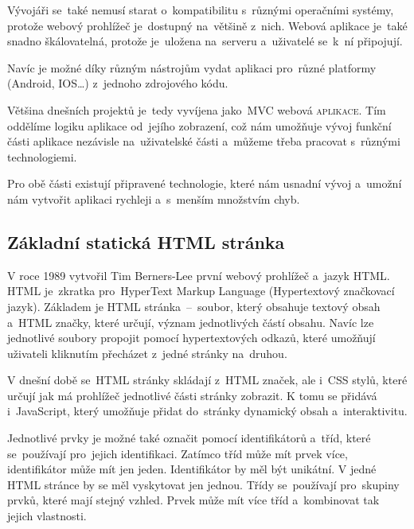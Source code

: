 \documentclass[14pt,a4paper]{article}
\begin{document}
    Vývojáři se~také nemusí starat o~kompatibilitu s~různými operačními systémy, protože webový prohlížeč
    je~dostupný na~většině z~nich. Webová aplikace je~také snadno škálovatelná, protože je~uložena na~serveru a~uživatelé se~k~ní připojují.
    
    Navíc je možné díky různým nástrojům vydat aplikaci pro~různé platformy (Android, IOS\dots) z~jednoho zdrojového kódu.\parencite{adobe:webapp}

    Většina dnešních projektů je~tedy vyvíjena jako~MVC webová \textsc{aplikace}. Tím oddělíme logiku aplikace od~jejího zobrazení, což nám umožňuje vývoj funkční části aplikace nezávisle na~uživatelské části a~můžeme třeba pracovat s~různými technologiemi.
    
    Pro obě části existují připravené technologie, které nám usnadní vývoj a~umožní nám vytvořit aplikaci rychleji a~s~menším množstvím chyb.

    \parencite{itnetworkBestPractices}

        \subsection{Základní statická HTML stránka}
        V roce 1989 vytvořil Tim Berners-Lee první webový prohlížeč a~jazyk HTML. HTML je~zkratka pro~HyperText Markup Language (Hypertextový značkovací jazyk).
        Základem je HTML stránka~--~soubor, který obsahuje textový obsah a~HTML značky, které určují, význam jednotlivých částí obsahu.
        Navíc lze jednotlivé soubory propojit pomocí hypertextových odkazů, které umožňují uživateli kliknutím přecházet z~jedné stránky na~druhou.

        V dnešní době se~HTML stránky skládají z~HTML značek, ale i~CSS stylů, které určují jak má prohlížeč jednotlivé části stránky zobrazit.
        K tomu se přidává i~JavaScript, který umožňuje přidat do~stránky dynamický obsah a~interaktivitu. \parencite{berners:1989:proposal}

        Jednotlivé prvky je možné také označit pomocí identifikátorů a~tříd, které se~používají pro~jejich identifikaci.
        Zatímco tříd může mít prvek více, identifikátor může mít jen jeden. Identifikátor by měl být unikátní. V jedné HTML stránce by se měl vyskytovat jen jednou.
        Třídy se~používají pro~skupiny prvků, které mají stejný vzhled. Prvek může mít více tříd a~kombinovat tak jejich vlastnosti. \parencite{jpw:tridy}
\end{document}
